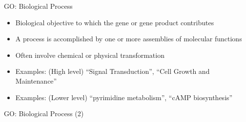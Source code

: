 \documentclass{beamer}
\begin{document}

\begin{frame}{GO: Biological Process}
\begin{itemize}
\item Biological objective to which the gene or gene product contributes
\item A process is accomplished by one or more assemblies of molecular functions
\item Often involve chemical or physical transformation
\item Examples: (High level) \textquotedblleft Signal Transduction\textquotedblright, 
\textquotedblleft Cell Growth and Maintenance\textquotedblright
\item Examples: (Lower level) \textquotedblleft pyrimidine metabolism\textquotedblright, 
\textquotedblleft cAMP biosynthesis\textquotedblright
\end{itemize}
\end{frame}


\begin{frame}{GO: Biological Process (2)}
\begin{center}
\end{center}
\end{frame}
\end{document}
